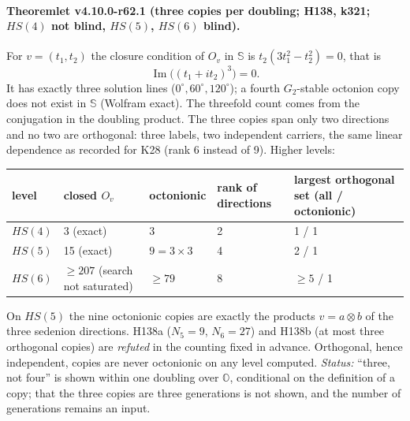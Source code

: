 \paragraph{Theoremlet v4.10.0-r62.1 (three copies per doubling; H138, k321; \(HS(4)\) not blind, \(HS(5)\), \(HS(6)\) blind).}
For \(v=(t_1,t_2)\) the closure condition of \(O_v\) in \(\mathbb S\) is \(t_2(3t_1^2-t_2^2)=0\), that is
\[
\operatorname{Im}\bigl((t_1+i t_2)^3\bigr)=0 .
\]
It has exactly three solution lines (\(0^\circ,60^\circ,120^\circ\)); a fourth \(G_2\)-stable octonion copy does not exist in \(\mathbb S\)
(Wolfram exact).  The threefold count comes from the conjugation in the doubling product.  The three copies span only two directions and no two
are orthogonal: three labels, two independent carriers, the same linear dependence as recorded for K28 (rank 6 instead of 9).  Higher levels:
\begin{center}
\small
\begin{tabular}{@{}lllll@{}}
\toprule
level & closed \(O_v\) & octonionic & rank of directions & largest orthogonal set (all / octonionic)\\
\midrule
\(HS(4)\) & 3 (exact) & 3 & 2 & 1 / 1\\
\(HS(5)\) & 15 (exact) & \(9=3\times3\) & 4 & 2 / 1\\
\(HS(6)\) & \(\ge 207\) (search not saturated) & \(\ge 79\) & 8 & \(\ge5\) / 1\\
\bottomrule
\end{tabular}
\end{center}
On \(HS(5)\) the nine octonionic copies are exactly the products \(v=a\otimes b\) of the three sedenion directions.  H138a (\(N_5=9\),
\(N_6=27\)) and H138b (at most three orthogonal copies) are \emph{refuted} in the counting fixed in advance.  Orthogonal, hence independent,
copies are never octonionic on any level computed.  \emph{Status:} ``three, not four'' is shown within one doubling over \(\mathbb O\), conditional
on the definition of a copy; that the three copies are three generations is not shown, and the number of generations remains an input.

